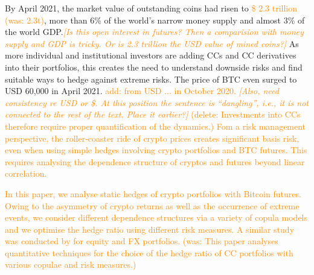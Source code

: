 \documentclass[11pt,a4paper,english]{article}
\providecommand{\natp}[1]{\textcolor{darkorange}{#1}}
\begin{document}
By April 2021, the market value of outstanding coins had risen to
\natp{\$ 2.3 trillion (was: 2.3t)},
more than 6\% of the world's narrow money supply and almost 3\% of the
world GDP.\natp{\em [Is this open interest in futures? Then a
  comparision with money supply and GDP is tricky. Or is 2.3
  trillion the USD value of mined coins?]}
As more individual and institutional investors are
adding CCs and CC derivatives into their portfolios, this creates
the need to understand downside risks and find suitable ways to
hedge against extreme risks. 
The price of BTC even surged to USD 60,000 in April 2021. \natp{
  add: from USD ... in October 2020. {\em [Also, need consistency re
    USD or \$. At this position the sentence is ``dangling'', i.e., it
    is not connected to the rest of the text. Place it earlier?]}}
\natp{(delete: Investments into CCs therefore require proper
  quantification of the dynamics.)}
\natp{Fom a risk management perspective, the roller-coaster ride
  of crypto prices creates significant basis risk, even when using
  simple hedges involving crypto portfolios and BTC futures. This
  requires analysing the dependence structure of cryptos and
  futures beyond linear correlation.}

\natp{In this paper, we analyse static hedges of crypto portfolios
  with Bitcoin futures. Owing to the asymmetry of crypto returns as
  well as the occurrence of extreme events, we consider different 
  dependence structures via a variety of copula models and we optimise
  the hedge ratio using different risk measures. A similar study was
  conducted by \citep{barbi2014copula} for equity and FX portfolios. 
(was: This paper analyses quantitative techniques for the choice of the
hedge ratio of CC portfolios with various copulae and risk
measures.)} \medskip 
%
%


\end{document}
